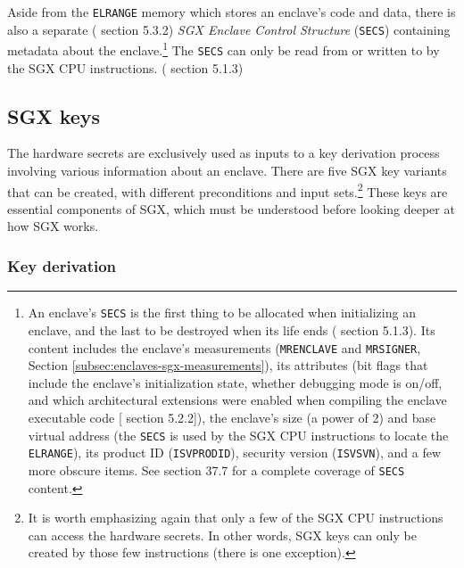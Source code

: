 Aside from the {\tt ELRANGE} memory which stores an enclave's code and data, there is also a separate (\cite{intel-sgx-explained-advanced} section 5.3.2) {\em SGX Enclave Control Structure} ({\tt SECS}) containing metadata about the enclave.\footnote{An enclave's {\tt SECS} is the first thing to be allocated when initializing an enclave, and the last to be destroyed when its life ends (\cite{intel-sgx-explained-advanced} section 5.1.3). Its content includes the enclave's measurements ({\tt MRENCLAVE} and {\tt MRSIGNER}, Section \ref{subsec:enclaves-sgx-measurements}), its attributes (bit flags that include the enclave's initialization state, whether debugging mode is on/off, and which architectural extensions were enabled when compiling the enclave executable code [\cite{intel-sgx-explained-advanced} section 5.2.2]), the enclave's size (a power of 2) and base virtual address (the {\tt SECS} is used by the SGX CPU instructions to locate the {\tt ELRANGE}), its product ID ({\tt ISVPRODID}), security version ({\tt ISVSVN}), and a few more obscure items. See \cite{sgx-manual} section 37.7 for a complete coverage of {\tt SECS} content.} The {\tt SECS} can only be read from or written to by the SGX CPU instructions. (\cite{intel-sgx-explained-advanced} section 5.1.3)


\subsection{SGX keys}
\label{subsec:enclaves-sgx-keys}

The hardware secrets are exclusively used as inputs to a key derivation process involving various information about an enclave. There are five SGX key variants that can be created, with different preconditions and input sets.\footnote{It is worth emphasizing again that only a few of the SGX CPU instructions can access the hardware secrets. In other words, SGX keys can only be created by those few instructions (there is one exception).} These keys are essential components of SGX, which must be understood before looking deeper at how SGX works.

\subsubsection{Key derivation}

